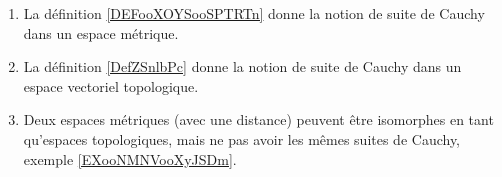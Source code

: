 \begin{enumerate}
    \item
        La définition \ref{DEFooXOYSooSPTRTn} donne la notion de suite de Cauchy dans un espace métrique.
    \item
        La définition \ref{DefZSnlbPc} donne la notion de suite de Cauchy dans un espace vectoriel topologique.
    \item
        Deux espaces métriques (avec une distance) peuvent être isomorphes en tant qu'espaces topologiques, mais ne pas avoir les mêmes suites de Cauchy, exemple \ref{EXooNMNVooXyJSDm}.
\end{enumerate}
